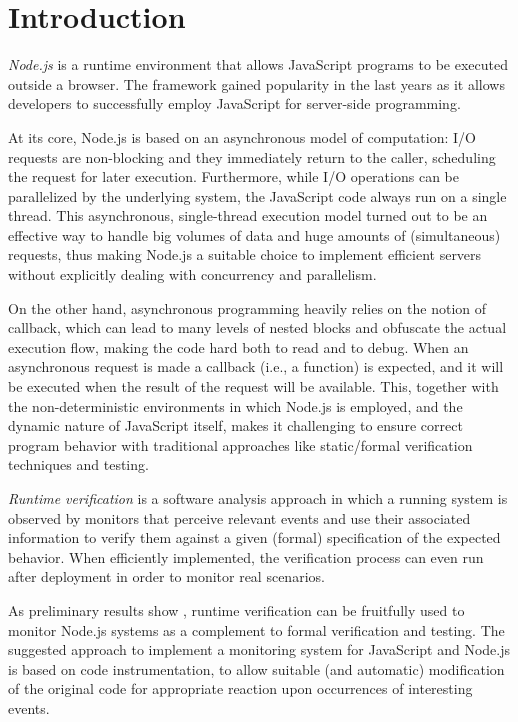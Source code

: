 \section{Introduction}
\emph{Node.js} is a runtime environment that allows JavaScript programs to be executed outside a browser.
The framework gained popularity in the last years as it allows developers to successfully employ JavaScript for server-side programming.

At its core, Node.js is based on an asynchronous model of computation: I/O requests are non-blocking and they immediately return to the caller, scheduling the request for later execution.
Furthermore, while I/O operations can be parallelized by the underlying system, the JavaScript code always run on a single thread.
This asynchronous, single-thread execution model turned out to be an effective way to handle big volumes of data and huge amounts of (simultaneous) requests, thus making Node.js a suitable choice to implement efficient servers without explicitly dealing with concurrency and parallelism.

%

On the other hand, asynchronous programming heavily relies on the notion of callback, which can lead to many levels of nested blocks and obfuscate the actual execution flow, making the code hard both to read and to debug.
When an asynchronous request is made a callback (i.e., a function) is expected, and it will be executed when the result of the request will be available.
This, together with the non-deterministic environments in which Node.js is employed, and the dynamic nature of JavaScript itself, makes it challenging to ensure correct program behavior with traditional approaches like static/formal verification techniques and testing.

\emph{Runtime verification} is a software analysis approach in which a running system is observed by monitors that perceive relevant events and use their associated information to verify them against a given (formal) specification of the expected behavior.
When efficiently implemented, the verification process can even run after deployment in order to monitor real scenarios.

As preliminary results show \cite{TowardsIoT17}, runtime verification can be fruitfully used to monitor Node.js systems as a complement to formal verification and testing.
The suggested approach to implement a monitoring system for JavaScript and Node.js is based on code instrumentation, to allow suitable (and automatic) modification of the original code for appropriate reaction upon occurrences of interesting events.


